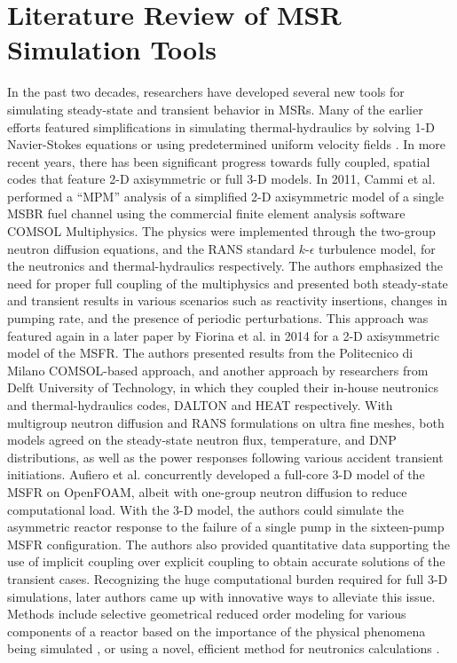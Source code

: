 \section{Literature Review of MSR Simulation Tools}

In the past two decades, researchers have developed several
new tools for simulating steady-state and transient behavior in \glspl{MSR}.
Many of the earlier efforts featured simplifications in simulating
thermal-hydraulics by solving 1-D Navier-Stokes equations or using
predetermined uniform velocity fields \cite{krepel_dyn3d-msr_2007,
kophazi_development_2009}. In more recent years, there has been
significant progress towards fully coupled, spatial codes that feature
2-D axisymmetric or full 3-D models. In 2011, Cammi et al.
\cite{cammi_multi-physics_2011} performed a ``\gls{MPM}'' analysis
of a simplified 2-D axisymmetric model of a single \gls{MSBR} fuel channel
using the commercial finite element analysis software COMSOL Multiphysics. The
physics were implemented through the two-group neutron diffusion equations,
and the \gls{RANS} standard $k$-$\epsilon$ turbulence model, for the
neutronics and thermal-hydraulics respectively. The
authors emphasized the need for proper full coupling of the multiphysics and
presented both steady-state and transient results in various
scenarios such as reactivity insertions, changes in pumping rate, and the
presence of periodic perturbations. This approach was featured again in a
later paper by Fiorina et al. \cite{fiorina_modelling_2014} in 2014 for a 2-D
axisymmetric model of the
\gls{MSFR}. The authors presented results from the Politecnico di Milano
COMSOL-based approach, and another approach by researchers from Delft
University of Technology, in which they coupled their in-house neutronics and
thermal-hydraulics codes, DALTON and HEAT respectively. With multigroup
neutron diffusion and \gls{RANS} formulations on ultra fine meshes, both
models agreed on the steady-state neutron flux, temperature,
and \gls{DNP} distributions, as well as the power responses following various
accident transient initiations. Aufiero et al. \cite{aufiero_development_2014}
concurrently developed
a full-core 3-D model of the \gls{MSFR} on OpenFOAM, albeit with one-group
neutron diffusion to reduce computational load. With the 3-D model, the
authors could simulate the asymmetric reactor response to the failure of a
single pump in the sixteen-pump \gls{MSFR} configuration. The authors also
provided quantitative data supporting the use of implicit coupling over
explicit coupling to obtain accurate solutions of the transient cases.
Recognizing the huge computational burden required for full 3-D simulations, 
later authors came up with innovative ways to alleviate this issue. Methods
include
selective geometrical reduced order modeling for various components of a
reactor based on the importance of the physical phenomena being simulated
\cite{zanetti_geometric_2015}, or using a novel, efficient method for
neutronics calculations \cite{laureau_transient_2017}.

